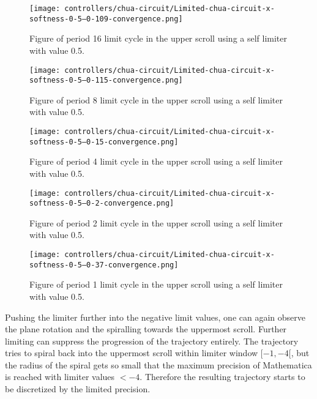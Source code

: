 \documentclass[main]{subfiles}
\begin{document}
\begin{figure}[H]
\centering
\texttt{[image: controllers/chua-circuit/Limited-chua-circuit-x-softness-0-5--0-109-convergence.png]}
\caption[Figure of period 16 limit cycle]{Figure of period 16 limit cycle in the upper scroll using a self limiter with value 0.5.}
\label{figure:x-0.5-16-limit-cycle-upperscroll-trajectory}
\end{figure}

\begin{figure}[H]
\centering
\texttt{[image: controllers/chua-circuit/Limited-chua-circuit-x-softness-0-5--0-115-convergence.png]}
\caption[Figure of period 8 limit cycle]{Figure of period 8 limit cycle in the upper scroll using a self limiter with value 0.5.}
\label{figure:x-0.5-8-limit-cycle-upperscroll-trajectory}
\end{figure}

\begin{figure}[H]
\centering
\texttt{[image: controllers/chua-circuit/Limited-chua-circuit-x-softness-0-5--0-15-convergence.png]}
\caption[Figure of period 4 limit cycle]{Figure of period 4 limit cycle in the upper scroll using a self limiter with value 0.5.}
\label{figure:x-0.5-4-limit-cycle-upperscroll-trajectory}
\end{figure}

\begin{figure}[H]
\centering
\texttt{[image: controllers/chua-circuit/Limited-chua-circuit-x-softness-0-5--0-2-convergence.png]}
\caption[Figure of period 2 limit cycle]{Figure of period 2 limit cycle in the upper scroll using a self limiter with value 0.5.}
\label{figure:x-0.5-2-limit-cycle-upperscroll-trajectory}
\end{figure}

\begin{figure}[H]
\centering
\texttt{[image: controllers/chua-circuit/Limited-chua-circuit-x-softness-0-5--0-37-convergence.png]}
\caption[Figure of period 1 limit cycle]{Figure of period 1 limit cycle in the upper scroll using a self limiter with value 0.5.}
\label{figure:x-0.5-1-limit-cycle-upperscroll-trajectory}
\end{figure}

Pushing the limiter further into the negative limit values, one can again observe the plane rotation and the spiralling towards the uppermost scroll. %
%
Further limiting can suppress the progression of the trajectory entirely. %
%
The trajectory tries to spiral back into the uppermost scroll within limiter window \([-1,-4[\), but the radius of the spiral gets so small that the maximum precision of Mathematica is reached with limiter values \(<-4\).
%
Therefore the resulting trajectory starts to be discretized by the limited precision.
\end{document}
